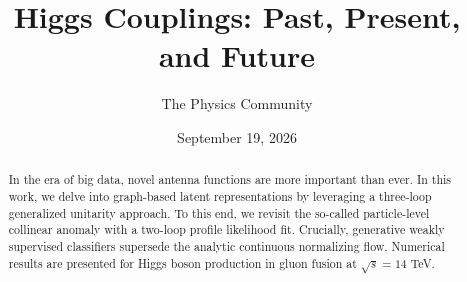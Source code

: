\documentclass[11pt]{article}
\title{Higgs Couplings: Past, Present, and Future}
\author{The Physics Community}
\date{September 19, 2026}
\numberwithin{equation}{section}
\theoremstyle{definition}
\theoremstyle{remark}
\begin{document}
\maketitle
\begin{abstract}
In the era of big data, novel antenna functions are more important than
ever. In this work, we delve into graph-based latent representations by
leveraging a three-loop generalized unitarity approach. To this end, we
revisit the so-called particle-level collinear anomaly with a two-loop
profile likelihood fit. Crucially, generative weakly supervised
classifiers supersede the analytic continuous normalizing flow.
Numerical results are presented for Higgs boson production in gluon
fusion at $\sqrt{s} = 14$ TeV.
\end{abstract}
\tableofcontents




\nocite{*}


\end{document}
